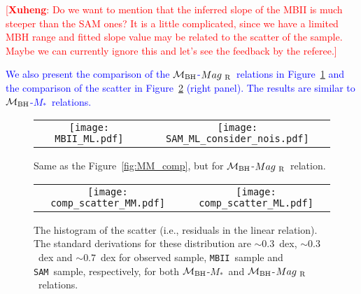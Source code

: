 \documentclass[twocolumn,trackchanges]{aastex63}
\newcommand{\mbh}{$\mathcal M_{\rm BH}$}
\newcommand{\mr}{$Mag_{\rm ~R}$}
\newcommand{\mstar}{{$M_*$}}
\newcommand{\sam}{\texttt{SAM}}
\newcommand{\mbii}{\texttt{MBII}}
\newcommand{\ding}[1]{\textcolor{red}{[{\bf Xuheng}: #1]}}
\newcommand{\blue}[1]{{ \textcolor{blue}{#1}}}
\begin{document}
 \ding{Do we want to mention that the inferred slope of the MBII is much steeper than the SAM ones? It is a little complicated, since we have a limited MBH range and fitted slope value may be related to the scatter of the sample. Maybe we can currently ignore this and let's see the feedback by the referee.}

\blue{We also present the comparison of the \mbh-\mr\ relations in Figure~\ref{fig:ML_comp} and the comparison of the scatter in Figure~\ref{fig:offset_comp} (right panel). The results are similar to \mbh-\mstar\ relations.}

\begin{figure*}[t]%
\begin{tabular}{c c}
\texttt{[image: MBII\_ML.pdf]} &
\texttt{[image: SAM\_ML\_consider\_nois.pdf]} \\
\end{tabular}
\caption{Same as the Figure~\ref{fig:MM_comp}, but for \mbh-\mr\ relation.}
\label{fig:ML_comp}
\end{figure*}


\begin{figure*}[t]%
\begin{tabular}{c c}
\texttt{[image: comp\_scatter\_MM.pdf]} &
\texttt{[image: comp\_scatter\_ML.pdf]} \\
\end{tabular}
\caption{The histogram of the scatter (i.e., residuals in the linear relation). The standard derivations for these distribution are $\sim0.3$~dex, $\sim0.3$~dex and $\sim0.7$~dex for observed sample, \mbii\ sample and \sam\ sample, respectively, for both \mbh-\mstar\ and \mbh-\mr\ relations.
}
\label{fig:offset_comp}
\end{figure*}
\end{document}
